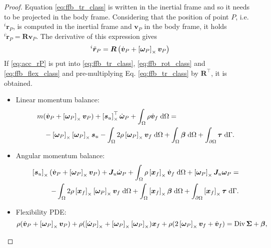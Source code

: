 \begin{proof}
Equation \eqref{eq:ffb_tr_class} is written in the inertial frame and so it needs to be projected in the body frame. Considering that the position of point $P$, i.e. $^{i}{\bm{r}}_P$, is computed in the inertial frame and $\bm{v}_P$ in the body frame, it holds $^{i}\dot{\bm{r}}_P = \bm{R} \bm{v}_P$. The derivative of this expression gives
\begin{equation}
\label{eq:acc_rP}
^{i}\ddot{\bm{r}}_P = \bm{R} \left(\dot{\bm{v}}_P + \left[\bm{\omega}_P\right]_\times \bm{v}_P \right)
\end{equation}
If \eqref{eq:acc_rP} is put into \eqref{eq:ffb_tr_class}, \eqref{eq:ffb_rot_class} and \eqref{eq:ffb_flex_class} and pre-multiplying  Eq. \eqref{eq:ffb_tr_class} by $\bm{R}^\top$, it is obtained.
\begin{itemize}
	\item Linear momentum balance:
	\begin{equation}
	\label{eq:ffb_tr_int}
	\begin{split}
	&m (\dot{\bm{v}}_P + \crmat{\bm{\omega}_P} \bm{v}_P) + \crmat{\bm{s}_u}^\top \dot{\bm{\omega}}_P  + \int_{\Omega} \rho \dot{\bm{v}}_f \d{\Omega} = \\
	&\quad - \crmat{\bm{\omega}_P} \crmat{\bm{\omega}_P} \bm{s}_u - \int_{\Omega} 2 \rho \crmat{\bm{\omega}_P} {\bm{v}}_f \d{\Omega} +  \int_{\Omega} \bm\beta \d{\Omega} + \int_{\partial \Omega} \bm\tau \d{\Gamma}.
	\end{split}
	\end{equation}
	\item Angular momentum balance:
	\begin{equation}
	\label{eq:ffb_rot_int}
	\begin{split}
	\crmat{\bm{s}_u} (\dot{\bm{v}}_P + \crmat{\bm{\omega}_P} \bm{v}_P) + \bm{J}_u \dot{\bm\omega}_P + \int_{\Omega} \rho \crmat{\bm{x}_f} \dot{\bm{v}}_f \d{\Omega} + \crmat{\bm{\omega}_P} \bm{J}_u \bm{\omega}_P = \\ 
	- \int_{\Omega} 2\rho \crmat{\bm{x}_f} \crmat{\bm\omega_P} {\bm{v}}_f \d{\Omega} + \int_{\Omega}\crmat{\bm{x}_f} \bm\beta \d{\Omega} + \int_{\partial \Omega}\crmat{\bm{x}_f} \bm\tau \d{\Gamma}. \\
	\end{split}
	\end{equation}
	\item Flexibility PDE:
	\begin{equation}
	\label{eq:ffb_flex_int}
	\rho (\dot{\bm{v}}_P + \left[\bm\omega_P\right]_\times \bm{v}_P) + \rho (\left[\dot{\bm\omega}_P\right]_\times + \left[\bm{\omega}_P\right]_\times\left[\bm{\omega}_P\right]_\times)\bm{x}_f + \rho (2 \left[\bm{\omega}_P\right]_\times {\bm{v}}_f + \dot{\bm{v}}_f) = \operatorname*{Div}{\bm\Sigma} + \bm\beta,
	\end{equation}
\end{itemize}


\end{proof}
